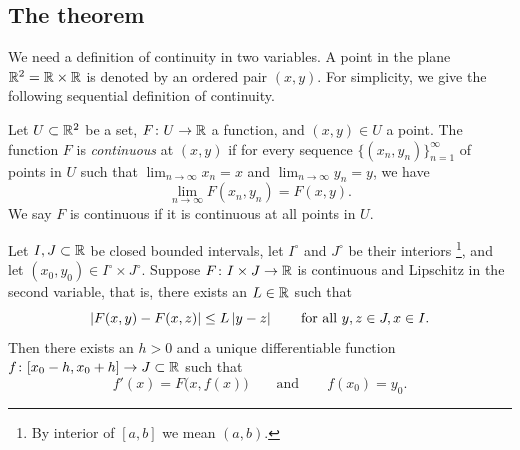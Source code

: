 \subsection{The theorem}

We need a definition of continuity in two variables.  A point in the
plane ${\mathbb{R}}^2 = {\mathbb{R}} \times {\mathbb{R}}$ is denoted by an ordered pair $(x,y)$.
For simplicity,
we give the following sequential definition of continuity.

\begin{defn}
Let $U \subset {\mathbb{R}}^2$ be a set, $F \colon U \to {\mathbb{R}}$ a function,
and $(x,y) \in U$ a point.  The function $F$ is \emph{continuous}
at $(x,y)$ if 
for every sequence
$\bigl\{ (x_n,y_n) \bigr\}_{n=1}^\infty$ of points in $U$ such that
$\lim_{n\to\infty} x_n = x$ and 
$\lim_{n\to\infty} y_n = y$, we have 
\begin{equation*}
\lim_{n \to \infty} F(x_n,y_n) = 
F(x,y) .
\end{equation*}
We say $F$ is continuous if it is continuous at all points in $U$.
\end{defn}

\begin{thm}%
%
\label{thm:fs:picard}
Let $I, J \subset {\mathbb{R}}$ be closed bounded intervals, 
let $I^\circ$ and $J^\circ$ be their interiors%
\footnote{By interior of $[a,b]$ we mean $(a,b)$.},
and
let $(x_0,y_0) \in I^\circ \times J^\circ$.
Suppose $F \colon I \times J \to {\mathbb{R}}$ is continuous
and Lipschitz in the second variable, that is, there exists
an $L \in {\mathbb{R}}$ such that
\begin{equation*}
\left\lvert {F(x,y) - F(x,z)} \right\rvert \leq L \left\lvert {y-z} \right\rvert
\qquad \text{for all } y,z \in J, x \in I .
\end{equation*}
Then there exists an $h > 0$ and a unique differentiable
function $f \colon [x_0 - h, x_0 + h] \to J \subset {\mathbb{R}}$ such that
\begin{equation} \label{picard:diffeq}
f'(x) = F\bigl(x,f(x)\bigr) \qquad \text{and} \qquad f(x_0) = y_0.
\end{equation}
\end{thm}

